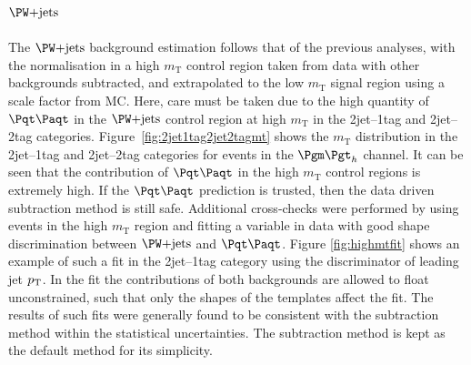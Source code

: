 \subsection{$\WJets$}

The $\WJets$ background estimation follows that of the previous analyses, with
the normalisation in a high $m_{\text{T}}$ control region taken from data with
other backgrounds subtracted, and extrapolated to the low $m_{\text{T}}$ signal
region using a scale factor from \ac{MC}. Here,
care must be taken due to the high quantity of $\ttbar$ in the $\WJets$ control
region at high $m_{\text{T}}$ in the 2jet--1tag and 2jet--2tag categories. 
Figure~\ref{fig:2jet1tag2jet2tagmt} shows the 
$m_{\text{T}}$ distribution in the 2jet--1tag and 2jet--2tag categories for
events in the $\mutau$ channel. It can
be seen that the contribution of $\ttbar$ in the high $m_{\text{T}}$ control
regions is extremely high. If the $\ttbar$ prediction is trusted, then the data
driven subtraction method is still safe. Additional cross-checks were performed by
using events in the high $m_{\text{T}}$ region and fitting a variable in data
with good shape discrimination between $\WJets$ and $\ttbar$. Figure
\ref{fig:highmtfit} shows an example of such a fit in the 2jet--1tag category
using the discriminator of leading jet $p_{\mathrm{T}}$. In the fit the contributions of
both backgrounds are allowed to float unconstrained, such that only the shapes of
the templates affect the fit. The results of such fits were generally found to be
consistent with the subtraction method within the statistical uncertainties.
The subtraction method is kept as the default method for its simplicity.  

